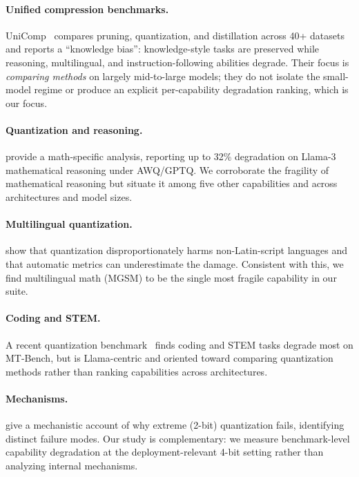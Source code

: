 \documentclass[11pt]{article}
\begin{document}
\paragraph{Unified compression benchmarks.} UniComp~\citep{unicomp2026} compares
pruning, quantization, and distillation across 40+ datasets and reports a
``knowledge bias'': knowledge-style tasks are preserved while reasoning,
multilingual, and instruction-following abilities degrade. Their focus is
\emph{comparing methods} on largely mid-to-large models; they do not isolate the
small-model regime or produce an explicit per-capability degradation ranking,
which is our focus.

\paragraph{Quantization and reasoning.} \citet{quantreasoning2025} provide a
math-specific analysis, reporting up to 32\% degradation on Llama-3 mathematical
reasoning under AWQ/GPTQ. We corroborate the fragility of mathematical reasoning
but situate it among five other capabilities and across architectures and model
sizes.

\paragraph{Multilingual quantization.} \citet{marchisio2024multilingual} show
that quantization disproportionately harms non-Latin-script languages and that
automatic metrics can underestimate the damage. Consistent with this, we find
multilingual math (MGSM) to be the single most fragile capability in our suite.

\paragraph{Coding and STEM.} A recent quantization benchmark~\citep{ijcai25quant}
finds coding and STEM tasks degrade most on MT-Bench, but is Llama-centric and
oriented toward comparing quantization methods rather than ranking capabilities
across architectures.

\paragraph{Mechanisms.} \citet{signaldegradation2026} give a mechanistic account
of why extreme (2-bit) quantization fails, identifying distinct failure modes.
Our study is complementary: we measure benchmark-level capability degradation at
the deployment-relevant 4-bit setting rather than analyzing internal mechanisms.
\end{document}
